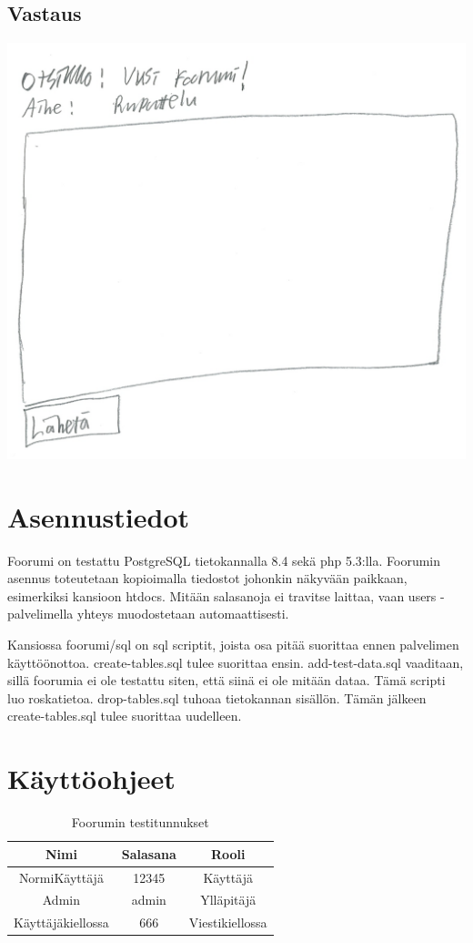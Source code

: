 \documentclass[a4paper, 12pt, finnish]{article}
\begin{document}
\subsection{Vastaus}
\includegraphics[width=\textwidth,height=\textheight,keepaspectratio]{vastaus.png}

\newpage

\section{Asennustiedot}
Foorumi on testattu PostgreSQL tietokannalla 8.4 sekä php 5.3:lla.
Foorumin asennus toteutetaan kopioimalla tiedostot johonkin näkyvään paikkaan, esimerkiksi kansioon htdocs.
Mitään salasanoja ei travitse laittaa, vaan users -palvelimella yhteys muodostetaan automaattisesti.
\indent

Kansiossa foorumi/sql on sql scriptit, joista osa pitää suorittaa ennen palvelimen käyttöönottoa.
create-tables.sql tulee suorittaa ensin.
add-test-data.sql vaaditaan, sillä foorumia ei ole testattu siten, että siinä ei ole mitään dataa.
Tämä scripti luo roskatietoa.
drop-tables.sql tuhoaa tietokannan sisällön. Tämän jälkeen create-tables.sql tulee suorittaa uudelleen.

\newpage

\section{Käyttöohjeet}
\begin{table}[ht]
\caption{Foorumin testitunnukset}
\centering
\begin{tabular}{c|c|c}
\hline
Nimi & Salasana & Rooli \\ [0.5ex]
\hline
NormiKäyttäjä&12345&Käyttäjä \\
Admin&admin&Ylläpitäjä \\
Käyttäjäkiellossa&666&Viestikiellossa \\ [1ex]
\hline
\end{tabular}
\end{table}
\end{document}
